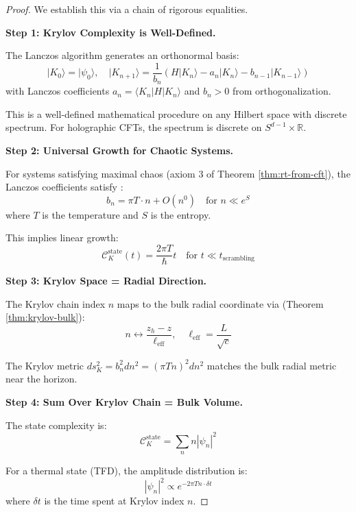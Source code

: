 \documentclass[12pt,a4paper]{article}
\begin{document}
\begin{proof}
We establish this via a chain of rigorous equalities.

\textbf{Step 1: Krylov Complexity is Well-Defined.}

The Lanczos algorithm generates an orthonormal basis:
\begin{equation}
|K_0\rangle = |\psi_0\rangle, \quad |K_{n+1}\rangle = \frac{1}{b_n}\left(H|K_n\rangle - a_n|K_n\rangle - b_{n-1}|K_{n-1}\rangle\right)
\end{equation}
with Lanczos coefficients $a_n = \langle K_n|H|K_n\rangle$ and $b_n > 0$ from orthogonalization.

This is a well-defined mathematical procedure on any Hilbert space with discrete spectrum. For holographic CFTs, the spectrum is discrete on $S^{d-1} \times \mathbb{R}$.

\textbf{Step 2: Universal Growth for Chaotic Systems.}

For systems satisfying maximal chaos (axiom 3 of Theorem \ref{thm:rt-from-cft}), the Lanczos coefficients satisfy \cite{parker2019}:
\begin{equation}
b_n = \pi T \cdot n + O(n^0) \quad \text{for } n \ll e^S
\end{equation}
where $T$ is the temperature and $S$ is the entropy.

This implies linear growth:
\begin{equation}
\mathcal{C}_K^{\text{state}}(t) = \frac{2\pi T}{\hbar} t \quad \text{for } t \ll t_{\text{scrambling}}
\end{equation}

\textbf{Step 3: Krylov Space = Radial Direction.}

The Krylov chain index $n$ maps to the bulk radial coordinate via (Theorem \ref{thm:krylov-bulk}):
\begin{equation}
n \longleftrightarrow \frac{z_h - z}{\ell_{\text{eff}}}, \quad \ell_{\text{eff}} = \frac{L}{\sqrt{c}}
\end{equation}

The Krylov metric $ds_K^2 = b_n^2 dn^2 = (\pi T n)^2 dn^2$ matches the bulk radial metric near the horizon.

\textbf{Step 4: Sum Over Krylov Chain = Bulk Volume.}

The state complexity is:
\begin{equation}
\mathcal{C}_K^{\text{state}} = \sum_n n |\psi_n|^2
\end{equation}

For a thermal state (TFD), the amplitude distribution is:
\begin{equation}
|\psi_n|^2 \propto e^{-2\pi T n \cdot \delta t}
\end{equation}
where $\delta t$ is the time spent at Krylov index $n$.


\end{proof}
\end{document}
